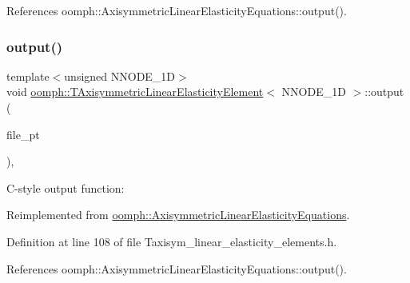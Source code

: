 References oomph\+::\+Axisymmetric\+Linear\+Elasticity\+Equations\+::output().

\mbox{\label{classoomph_1_1TAxisymmetricLinearElasticityElement_a8a33c1d33c51c47f563aed46f5a9d835}} 
\subsubsection{\texorpdfstring{output()}{output()}\hspace{0.1cm}{\footnotesize\ttfamily [3/4]}}
{\footnotesize\ttfamily template$<$unsigned N\+N\+O\+D\+E\+\_\+1D$>$ \\
void \hyperlink{classoomph_1_1TAxisymmetricLinearElasticityElement}{oomph\+::\+T\+Axisymmetric\+Linear\+Elasticity\+Element}$<$ N\+N\+O\+D\+E\+\_\+1D $>$\+::output (\begin{DoxyParamCaption}\item[{F\+I\+LE $\ast$}]{file\+\_\+pt }\end{DoxyParamCaption})\hspace{0.3cm}{\ttfamily [inline]}, {\ttfamily [virtual]}}



C-\/style output function\+: 



Reimplemented from \hyperlink{classoomph_1_1AxisymmetricLinearElasticityEquations_a8a96657fee4dd85fdbbf25d0855c27f2}{oomph\+::\+Axisymmetric\+Linear\+Elasticity\+Equations}.



Definition at line 108 of file Taxisym\+\_\+linear\+\_\+elasticity\+\_\+elements.\+h.



References oomph\+::\+Axisymmetric\+Linear\+Elasticity\+Equations\+::output().

\mbox{\label{classoomph_1_1TAxisymmetricLinearElasticityElement_a834bb7feb673a5cf90b07ee16f6b1fa5}} 
